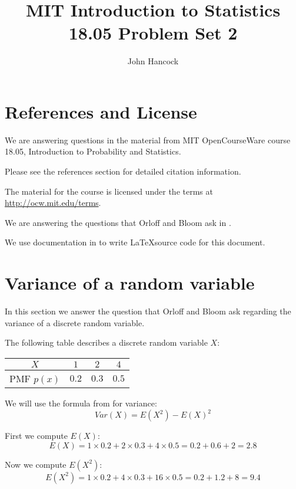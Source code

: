 \documentclass[a4paper,11pt]{article}
\author{John Hancock}
\title{MIT Introduction to Statistics 18.05 Problem Set 2 }
\begin{document}
\maketitle
\tableofcontents
\section{References and License}
We are answering questions in the material from MIT OpenCourseWare
course 18.05, Introduction to Probability and Statistics.

Please see the references section for detailed citation information.

The material for the course is licensed under the terms at
\url{http://ocw.mit.edu/terms}.

We are answering the questions that Orloff and Bloom ask in
\cite{reading5aQuestions}.

We use documentation in to
write \LaTeX source code for this document.

\section{Variance of a random variable}
In this section we answer the question that Orloff and Bloom ask regarding
the variance of a discrete random variable.

The following table describes a discrete random variable $X$:

\begin{center}
\begin{tabular}{ | c | c | c | c|}
    \hline
    $X$ & $1$ & $2$ & $4$ \\ \hline
		PMF $p \left(x \right)$ & $0.2$ & $0.3$ & $0.5$ \\ \hline
\end{tabular}
\end{center}

We will use the formula from \cite{reading5a} for variance:
\begin{equation}\label{varFormula}
	Var \left( X \right) = E \left( X^{2} \right) - E \left( X\right)^{2}
\end{equation}

First we compute $E \left( X \right)$:
\begin{equation}
  E \left( X \right) = 1 \times 0.2 + 2 \times 0.3 + 4 \times 0.5
    = 0.2 + 0.6 + 2 = 2.8
\end{equation}

Now we compute $E \left( X^{2} \right)$:
\begin{equation}
  E \left( X^{2} \right)
    = 1 \times 0.2 + 4 \times 0.3 + 16 \times 0.5
    = 0.2 + 1.2 + 8
    = 9.4
\end{equation}
\end{document}
